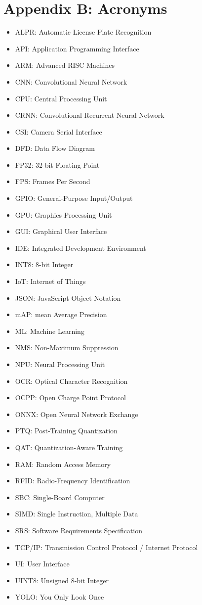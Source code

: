 \documentclass[11pt]{report}
\begin{document}
\chapter{Appendix B: Acronyms}
\begin{itemize}
    \item ALPR: Automatic License Plate Recognition
    \item API: Application Programming Interface
    \item ARM: Advanced RISC Machines
    \item CNN: Convolutional Neural Network
    \item CPU: Central Processing Unit
    \item CRNN: Convolutional Recurrent Neural Network
    \item CSI: Camera Serial Interface
    \item DFD: Data Flow Diagram
    \item FP32: 32-bit Floating Point
    \item FPS: Frames Per Second
    \item GPIO: General-Purpose Input/Output
    \item GPU: Graphics Processing Unit
    \item GUI: Graphical User Interface
    \item IDE: Integrated Development Environment
    \item INT8: 8-bit Integer
    \item IoT: Internet of Things
    \item JSON: JavaScript Object Notation
    \item mAP: mean Average Precision
    \item ML: Machine Learning
    \item NMS: Non-Maximum Suppression
    \item NPU: Neural Processing Unit
    \item OCR: Optical Character Recognition
    \item OCPP: Open Charge Point Protocol
    \item ONNX: Open Neural Network Exchange
    \item PTQ: Post-Training Quantization
    \item QAT: Quantization-Aware Training
    \item RAM: Random Access Memory
    \item RFID: Radio-Frequency Identification
    \item SBC: Single-Board Computer
    \item SIMD: Single Instruction, Multiple Data
    \item SRS: Software Requirements Specification
    \item TCP/IP: Transmission Control Protocol / Internet Protocol
    \item UI: User Interface
    \item UINT8: Unsigned 8-bit Integer
    \item YOLO: You Only Look Once
\end{itemize}
\end{document}
